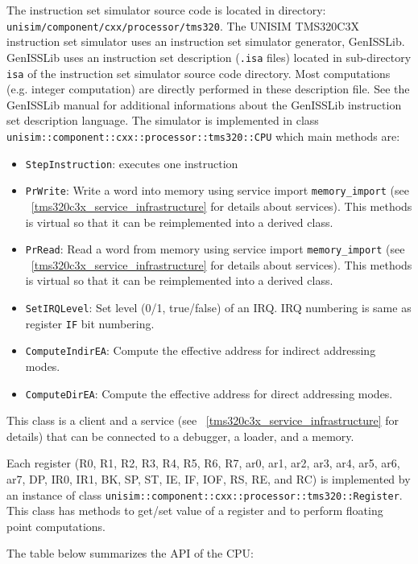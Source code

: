 The instruction set simulator source code is located in directory: \newline \texttt{unisim/component/cxx/processor/tms320}.\newline
The UNISIM TMS320C3X instruction set simulator uses an instruction set simulator generator, GenISSLib.
GenISSLib uses an instruction set description (\texttt{.isa} files) located in sub-directory \texttt{isa} of the instruction set simulator source code directory.
Most computations (e.g. integer computation) are directly performed in these description file.
See the GenISSLib manual for additional informations about the GenISSLib instruction set description language.
The simulator is implemented in class \texttt{unisim::component::cxx::processor::tms320::CPU} which main methods are:
\begin{itemize}
\item \texttt{StepInstruction}: executes one instruction
\item \texttt{PrWrite}: Write a word into memory using service import \texttt{memory\_import} (see ~\ref{tms320c3x_service_infrastructure} for details about services). This methods is virtual so that it can be reimplemented into a derived class.
\item \texttt{PrRead}: Read a word from memory using service import \texttt{memory\_import} (see ~\ref{tms320c3x_service_infrastructure} for details about services). This methods is virtual so that it can be reimplemented into a derived class.
\item \texttt{SetIRQLevel}: Set level (0/1, true/false) of an IRQ. IRQ numbering is same as register \texttt{IF} bit numbering.
\item \texttt{ComputeIndirEA}: Compute the effective address for indirect addressing modes.
\item \texttt{ComputeDirEA}: Compute the effective address for direct addressing modes.
\end{itemize}
This class is a client and a service (see ~\ref{tms320c3x_service_infrastructure} for details) that can be connected to a debugger, a loader, and a memory.

Each register (R0, R1, R2, R3, R4, R5, R6, R7, ar0, ar1, ar2, ar3, ar4, ar5, ar6, ar7, DP, IR0, IR1, BK, SP, ST, IE, IF, IOF, RS, RE, and RC) is implemented by an instance of class \texttt{unisim::component::cxx::processor::tms320::Register}.
This class has methods to get/set value of a register and to perform floating point computations.

\noindent The table below summarizes the API of the CPU:

